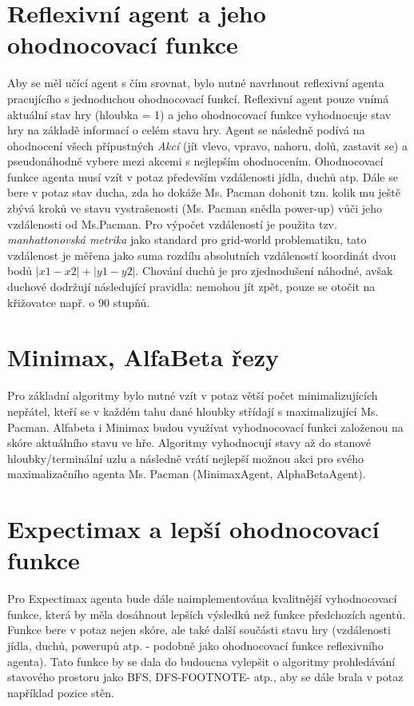 \section{Reflexivní agent a jeho ohodnocovací funkce}
Aby se měl učící agent s čím srovnat, bylo nutné navrhnout reflexivní agenta pracujícího s jednoduchou ohodnocovací funkcí. Reflexivní agent pouze vnímá aktuální stav hry (hloubka = 1) a jeho ohodnocovací funkce vyhodnocuje stav hry na základě informací o celém stavu hry. Agent se následně podívá na ohodnocení všech přípustných \textit{Akcí} (jít vlevo, vpravo, nahoru, dolů, zastavit se) a pseudonáhodně vybere mezi akcemi s nejlepším ohodnocením.  Ohodnocovací funkce agenta musí vzít v potaz především vzdálenosti jídla, duchů atp. Dále se bere v potaz stav ducha, zda ho dokáže Ms. Pacman dohonit tzn. kolik mu ještě zbývá kroků ve stavu vystrašenosti (Ms. Pacman snědla power-up) vůči jeho vzdálenosti od Ms.Pacman. Pro výpočet vzdáleností je použita tzv. \textit{manhattonovská metrika} jako standard pro grid-world problematiku, tato vzdálenost je měřena jako suma rozdílu absolutních vzdáleností koordinát dvou bodů $\left|x1-x2\right|+\left|y1-y2\right|$. Chování duchů je pro zjednodušení náhodné, avšak duchové dodržují následující pravidla: nemohou jít zpět, pouze se otočit na křižovatce např. o 90 stupňů.

\section{Minimax, AlfaBeta řezy}
Pro základní algoritmy bylo nutné vzít v potaz větší počet minimalizujících nepřátel, kteří se v každém tahu dané hloubky střídají s maximalizující Ms. Pacman. Alfabeta i Minimax budou využívat vyhodnocovací funkci založenou na skóre aktuálního stavu ve hře. Algoritmy vyhodnocují stavy až do stanové hloubky/terminální uzlu a následně vrátí nejlepší možnou akci pro svého maximalizačního agenta Ms. Pacman (MinimaxAgent, AlphaBetaAgent).

\section{Expectimax a lepší ohodnocovací funkce}
Pro Expectimax agenta bude dále naimplementována kvalitnější vyhodnocovací funkce, která by měla dosáhnout lepších výsledků než funkce předchozích agentů. Funkce bere v potaz nejen skóre, ale také další součásti stavu hry (vzdálenosti jídla, duchů, powerupů atp. - podobně jako ohodnocovací funkce reflexivního agenta). Tato funkce by se dala do budoucna vylepšit o algoritmy prohledávání stavového prostoru jako BFS, DFS-FOOTNOTE- atp., aby se dále brala v potaz například pozice stěn.

